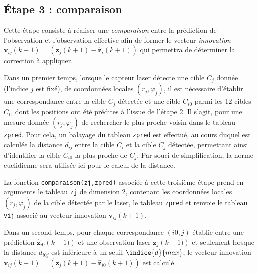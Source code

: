 \subsection*{Étape 3 : comparaison}

Cette étape consiste à réaliser une \textit{comparaison} entre la prédiction de l’observation et l’observation
effective afin de former le vecteur \textit{innovation} $\bm{v}_{ij}(k + 1) = \left(\bm{z}_{j}(k + 1) - \hat{\bm{z}}_{i}(k + 1)\right)$
qui permettra de
déterminer la correction à appliquer.

Dans un premier temps, lorsque le capteur laser détecte une cible $C_j$ donnée (l’indice $j$ est fixé), de
coordonnées locales $(r_j, \varphi_j)$, il est nécessaire d’établir une correspondance entre la cible $C_j$ détectée et
une cible $C_{i0}$ parmi les 12 cibles $C_i$, dont les positions ont été prédites à l’issue de l’étape 2. Il s’agit,
pour une mesure donnée $(r_j, \varphi_j)$ de rechercher le plus proche voisin dans le tableau \lstinline{zpred}. Pour cela,
un balayage du tableau \lstinline{zpred} est effectué, au cours duquel est calculée la distance $d_{i j}$ entre la cible
$C_i$ et la cible $C_j$ détectée, permettant ainsi d’identifier la cible $C_{i0}$ la plus proche de $C_j$. Par souci de
simplification, la norme euclidienne sera utilisée ici pour le calcul de la distance.


La fonction \lstinline{comparaison(zj,zpred)} associée à cette troisième étape prend en arguments le tableau
\lstinline{zj} de dimension 2, contenant les coordonnées locales $(r_j, \varphi_j)$ de la cible détectée par le laser, le tableau
\lstinline{zpred} et renvoie le tableau \lstinline{vij} associé au vecteur innovation $\bm{v}_{ij}(k + 1)$.


Dans un second temps, pour chaque correspondance $(i0, j)$ établie entre une prédiction $\hat{\bm{z}}_{i0}\left(k + 1)\right)$ et
une observation laser ${\bm{z}}_{j}\left(k + 1)\right)$ et seulement lorsque la distance $d_{i0j}$ est inférieure à un seuil $\indice{d}{max}$, le
vecteur innovation $\bm{v}_{ij}(k + 1) = \left(\bm{z}_{j}(k + 1) - \hat{\bm{z}}_{i0}(k + 1)\right)$
est calculé.


